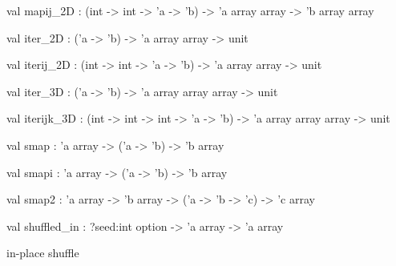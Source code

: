 \documentclass[11pt]{article}
\begin{document}
\begin{ocamldocsigend}
\label{val:Util.A.mapij-underscore2D}\begin{ocamldoccode}
val mapij_2D : (int -> int -> 'a -> 'b) -> 'a array array -> 'b array array
\end{ocamldoccode}


\label{val:Util.A.iter-underscore2D}\begin{ocamldoccode}
val iter_2D : ('a -> 'b) -> 'a array array -> unit
\end{ocamldoccode}


\label{val:Util.A.iterij-underscore2D}\begin{ocamldoccode}
val iterij_2D : (int -> int -> 'a -> 'b) -> 'a array array -> unit
\end{ocamldoccode}


\label{val:Util.A.iter-underscore3D}\begin{ocamldoccode}
val iter_3D : ('a -> 'b) -> 'a array array array -> unit
\end{ocamldoccode}


\label{val:Util.A.iterijk-underscore3D}\begin{ocamldoccode}
val iterijk_3D :
  (int -> int -> int -> 'a -> 'b) -> 'a array array array -> unit
\end{ocamldoccode}


\label{val:Util.A.smap}\begin{ocamldoccode}
val smap : 'a array -> ('a -> 'b) -> 'b array
\end{ocamldoccode}


\label{val:Util.A.smapi}\begin{ocamldoccode}
val smapi : 'a array -> ('a -> 'b) -> 'b array
\end{ocamldoccode}


\label{val:Util.A.smap2}\begin{ocamldoccode}
val smap2 : 'a array -> 'b array -> ('a -> 'b -> 'c) -> 'c array
\end{ocamldoccode}


\label{val:Util.A.shuffled-underscorein}\begin{ocamldoccode}
val shuffled_in : ?seed:int option -> 'a array -> 'a array
\end{ocamldoccode}
\begin{ocamldocdescription}
in-place shuffle



\end{ocamldocdescription}
\end{ocamldocsigend}
\end{document}
